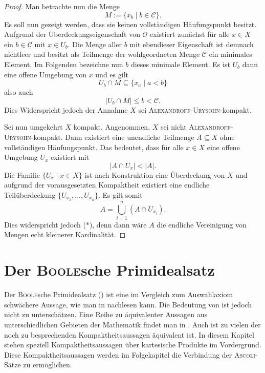 \begin{proof}
  Man betrachte nun die Menge
  \begin{displaymath}
    M := \{ x_b \mid b \in \mathcal{C} \}.
  \end{displaymath}
  Es soll nun gezeigt werden, dass sie keinen vollständigen Häufungspunkt besitzt. 
  Aufgrund der Überdeckungseigenschaft von $\mathcal{O}$ existiert zunächst für alle $x \in X$ ein $b \in \mathcal{C}$ mit $x \in U_b$.
  Die Menge aller $b$ mit ebendieser Eigenschaft ist demnach nichtleer und besitzt als Teilmenge der wohlgeordneten Menge $\mathcal{C}$ ein minimales Element.
  Im Folgenden bezeichne nun $b$ dieses minimale Element.
  Es ist $U_b$ dann eine offene Umgebung von $x$ und es gilt 
  \begin{displaymath}
    U_b \cap M \subseteq \{x_a \mid a < b\}
  \end{displaymath}
  also auch
  \begin{displaymath}
    |U_b \cap M| \leq b < \mathcal{C}.
  \end{displaymath}
  Dies Widerspricht jedoch der Annahme $X$ sei \textsc{Alexandroff}-\textsc{Urysohn}-kompakt.

  Sei nun umgekehrt $X$ kompakt.
  Angenommen, $X$ sei nicht \textsc{Alexandroff}-\textsc{Urysohn}-kompakt.
  Dann existiert eine unendliche Teilmenge $A \subseteq X$ ohne vollständigen Häufungspunkt.
  Das bedeutet, dass für alle $x \in X$ eine offene Umgebung $U_x$ existiert mit
  \begin{displaymath}
    | A \cap U_x | < | A |. \tag{$\ast$}
  \end{displaymath}
  Die Familie $\{U_x \mid x \in X\}$ ist nach Konstruktion eine Überdeckung von $X$ und aufgrund der vorausgesetzten Kompaktheit existiert eine endliche Teilüberdeckung $\{U_{x_1},\dots,U_{x_n}\}$.
  Es gilt somit
  \begin{displaymath}
    A = \bigcup_{i = 1}^n (A \cap U_{x_i}).
  \end{displaymath}
  Dies widerspricht jedoch ($\ast$), denn dann wäre $A$ die endliche Vereinigung von Mengen echt kleinerer Kardinalität. 
\end{proof}

\section{Der \textsc{Boole}sche Primidealsatz}

Der \textsc{Boole}sche Primidealsatz (\PIT) ist eine im Vergleich zum Auswahlaxiom schwächere Aussage, wie man in \cite{halpern1971boolean} nachlesen kann.
Die Bedeutung von \PIT ist jedoch nicht zu unterschätzen. Eine Reihe zu \PIT äquivalenter Aussagen aus unterschiedlichen Gebieten der Mathematik findet man in \cite{dau1994diplom}.
Auch ist \PIT zu vielen der noch zu besprechenden Kompaktheitsaussagen äquivalent ist. 
In diesem Kapitel stehen speziell Kompaktheitsaussagen über kartesische Produkte im Vordergrund. 
Diese Kompaktheitsaussagen werden im Folgekapitel die Verbindung der \textsc{Ascoli}-Sätze zu \PIT ermöglichen.

